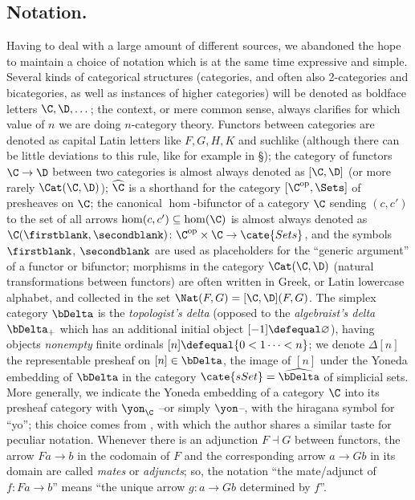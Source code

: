 \subsection*{Notation.} Having to deal with a large amount of different sources, we abandoned the hope to maintain a choice of notation which is at the same time expressive and simple.
Several kinds of categorical structures (categories, and often also 2\hyp{}categories and bicategories, as well as instances of higher categories) will be denoted as boldface letters $\C,\D,\dots$; the context, or mere common sense, always clarifies for which value of $n$ we are doing $n$\hyp{}category theory. 
Functors between categories are denoted as capital Latin letters like $F,G,H,K$ and suchlike (although there can be little deviations to this rule, like for example in \S{}); the category of functors $\C\to \D$ between two categories is almost always denoted as $[\C,\D]$ (or more rarely $\Cat(\C,\D)$); $\widehat{\C}$ is a shorthand for the category $[\C^\text{op},\Sets]$ of presheaves on $\C$; the canonical $\hom$\hyp{}bifunctor of a category $\C$ sending $(c,c')$ to the set of all arrows $\hom(c,c')\subseteq\hom(\C)$ is almost always denoted as $\C(\firstblank,\secondblank)\colon \C^\text{op}\times\C\to\cate{Sets}$, and the symbols $\firstblank$, $\secondblank$ are used as placeholders for the ``generic argument'' of a functor or bifunctor; morphisms in the category $\Cat(\C,\D)$ (\ie natural transformations between functors) are often written in Greek, or Latin lowercase alphabet, and collected in the set $\Nat(F,G) = [\C,\D](F,G)$. 
The simplex category $\bDelta$ is the \emph{topologist's delta} (opposed to the \emph{algebraist's delta} $\bDelta_+$ which has an additional initial object $[-1]\defequal \varnothing$), having objects \emph{nonempty} finite ordinals $[n]\defequal\{0<1\dots<n\}$; we denote $\Delta[n]$ the representable presheaf on $[n]\in\bDelta$, \ie the image of $[n]$ under the Yoneda embedding of $\bDelta$ in the category $\cate{sSet} = \widehat{\bDelta}$ of simplicial sets. More generally, we indicate the Yoneda embedding of a category $\C$ into its presheaf category with $\yon_\C$ --or simply $\yon$--, \ie with the hiragana symbol for ``yo''; this choice comes from \cite{Libland2015}, with which the author shares a similar taste for peculiar notation. Whenever there is an adjunction $F\dashv G$ between functors, the arrow $Fa\to b$ in the codomain of $F$ and the corresponding arrow $a\to Gb$ in its domain are called \emph{mates} or \emph{adjuncts}; so, the notation ``the mate/adjunct of $f\colon Fa\to b$'' means ``the unique arrow $g\colon a\to Gb$ determined by $f$''. 

